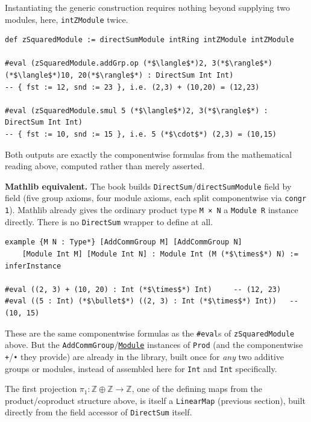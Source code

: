 Instantiating the generic construction requires nothing beyond supplying two modules, here, \texttt{intZModule} twice.

\begin{lstlisting}
def zSquaredModule := directSumModule intRing intZModule intZModule

#eval (zSquaredModule.addGrp.op (*$\langle$*)2, 3(*$\rangle$*) (*$\langle$*)10, 20(*$\rangle$*) : DirectSum Int Int)
-- { fst := 12, snd := 23 }, i.e. (2,3) + (10,20) = (12,23)

#eval (zSquaredModule.smul 5 (*$\langle$*)2, 3(*$\rangle$*) : DirectSum Int Int)
-- { fst := 10, snd := 15 }, i.e. 5 (*$\cdot$*) (2,3) = (10,15)
\end{lstlisting}

Both outputs are exactly the componentwise formulas from the mathematical reading above, computed rather than merely asserted.

\textbf{Mathlib equivalent.} The book builds \texttt{DirectSum}/\texttt{directSumModule} field by field (five group axioms, four module axioms, each split componentwise via \texttt{congr 1}). Mathlib already gives the ordinary product type \texttt{M × N} a \texttt{Module R} instance directly. There is no \texttt{DirectSum} wrapper to define at all.

\begin{lstlisting}
example {M N : Type*} [AddCommGroup M] [AddCommGroup N]
    [Module Int M] [Module Int N] : Module Int (M (*$\times$*) N) := inferInstance

#eval ((2, 3) + (10, 20) : Int (*$\times$*) Int)     -- (12, 23)
#eval ((5 : Int) (*$\bullet$*) ((2, 3) : Int (*$\times$*) Int))   -- (10, 15)
\end{lstlisting}

These are the same componentwise formulas as the \texttt{\#eval}s of \texttt{zSquaredModule} above. But the \texttt{AddCommGroup}/\href{https://loogle.lean-lang.org/?q=Module}{\texttt{Module}} instances of \texttt{Prod} (and the componentwise \texttt{+}/\texttt{•} they provide) are already in the library, built once for \emph{any} two additive groups or modules, instead of assembled here for \texttt{Int} and \texttt{Int} specifically.

The first projection \(\pi_1 : \mathbb{Z}\oplus\mathbb{Z} \to \mathbb{Z}\), one of the defining maps from the product/coproduct structure above, is itself a \texttt{LinearMap} (previous section), built directly from the field accessor of \texttt{DirectSum} itself.

